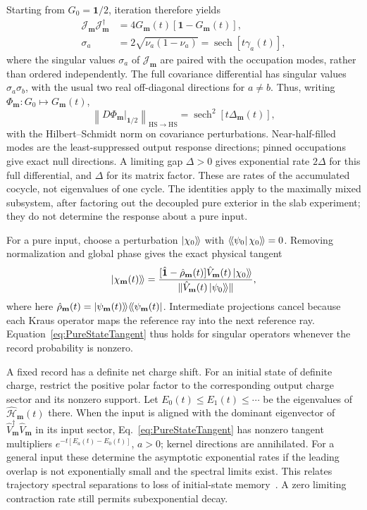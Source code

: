 \documentclass[aps,prb,10pt,twocolumn,superscriptaddress,longbibliography,floatfix]{revtex4-2}
\newcommand{\kett}[1]{\ket{#1}\!\rangle}
\newcommand{\braa}[1]{\langle\!\bra{#1}}
\newcommand{\rec}{\mathbf m}   %
\begin{document}
{Starting from $G_0=\mathbf1/2$, iteration therefore yields
\begin{align}
 \mathcal J_{\rec}\mathcal J_{\rec}^\dagger
 &=4G_{\rec}(t)[\mathbf1-G_{\rec}(t)],\nonumber\\
 \sigma_a&=2\sqrt{\nu_a(1-\nu_a)}
 =\operatorname{sech}[t\gamma_a(t)],
 \label{eq:MaxmixTangentSpectrum}
\end{align}
where the singular values $\sigma_a$ of $\mathcal J_{\rec}$ are paired with the occupation modes, rather than ordered independently. The full covariance differential has singular values $\sigma_a\sigma_b$, with the usual two real off-diagonal directions for $a\ne b$. Thus, writing $\Phi_{\rec}:G_0\mapsto G_{\rec}(t)$,
\begin{equation}
 \left\|D\Phi_{\rec}\big|_{\mathbf1/2}\right\|_{\mathrm{HS}\to\mathrm{HS}}
 =\operatorname{sech}^{2}[t\Delta_{\rec}(t)],
 \label{eq:MaxmixTangentNorm}
\end{equation}
with the Hilbert--Schmidt norm on covariance perturbations. Near-half-filled modes are the least-suppressed output response directions; pinned occupations give exact null directions. A limiting gap $\Delta>0$ gives exponential rate $2\Delta$ for this full differential, and $\Delta$ for its matrix factor. These are rates of the accumulated cocycle, not eigenvalues of one cycle. The identities apply to the maximally mixed subsystem, after factoring out the decoupled pure exterior in the slab experiment; they do not determine the response about a pure input.

For a pure input, choose a perturbation $\kett{\chi_0}$ with $\braa{\psi_0}\chi_0\rangle\!\rangle=0$. Removing normalization and global phase gives the exact physical tangent
\begin{equation}
 \kett{\chi_{\rec}(t)}=
 \frac{[\hat{\mathbf1}-\hat\rho_{\rec}(t)]\hat V_{\rec}(t)\kett{\chi_0}}
 {\|\hat V_{\rec}(t)\kett{\psi_0}\|},
 \label{eq:PureStateTangent}
\end{equation}
where here $\hat\rho_{\rec}(t)=\kett{\psi_{\rec}(t)}\braa{\psi_{\rec}(t)}$. Intermediate projections cancel because each Kraus operator maps the reference ray into the next reference ray. Equation~\eqref{eq:PureStateTangent} thus holds for singular operators whenever the record probability is nonzero.

A fixed record has a definite net charge shift. For an initial state of definite charge, restrict the positive polar factor to the corresponding output charge sector and its nonzero support. Let $E_0(t)\leq E_1(t)\leq\cdots$ be the eigenvalues of $\hat{\mathcal H}_{\rec}(t)$ there. When the input is aligned with the dominant eigenvector of $\hat V_{\rec}^\dagger\hat V_{\rec}$ in its input sector, Eq.~\eqref{eq:PureStateTangent} has nonzero tangent multipliers $e^{-t[E_a(t)-E_0(t)]}$, $a>0$; kernel directions are annihilated. For a general input these determine the asymptotic exponential rates if the leading overlap is not exponentially small and the spectral limits exist. This relates trajectory spectral separations to loss of initial-state memory~\cite{BulchandaniSondhiChalker2024}. A zero limiting contraction rate still permits subexponential decay.

}
\end{document}
